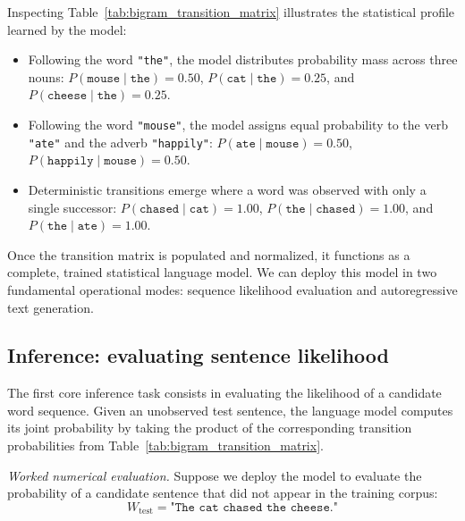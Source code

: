 \documentclass[../../../main.tex]{subfiles}
\begin{document}
Inspecting Table~\ref{tab:bigram_transition_matrix} illustrates the statistical profile learned by the model:
\begin{itemize}
    \item Following the word \texttt{"the"}, the model distributes probability mass across three nouns: $P(\texttt{mouse} \mid \texttt{the}) = 0.50$, $P(\texttt{cat} \mid \texttt{the}) = 0.25$, and $P(\texttt{cheese} \mid \texttt{the}) = 0.25$.
    \item Following the word \texttt{"mouse"}, the model assigns equal probability to the verb \texttt{"ate"} and the adverb \texttt{"happily"}: $P(\texttt{ate} \mid \texttt{mouse}) = 0.50$, $P(\texttt{happily} \mid \texttt{mouse}) = 0.50$.
    \item Deterministic transitions emerge where a word was observed with only a single successor: $P(\texttt{chased} \mid \texttt{cat}) = 1.00$, $P(\texttt{the} \mid \texttt{chased}) = 1.00$, and $P(\texttt{the} \mid \texttt{ate}) = 1.00$.
\end{itemize}

Once the transition matrix is populated and normalized, it functions as a complete, trained statistical language model. We can deploy this model in two fundamental operational modes: sequence likelihood evaluation and autoregressive text generation.

\subsection{Inference: evaluating sentence likelihood}
\label{subsec:evaluating_sentence_likelihood}

The first core inference task consists in evaluating the likelihood of a candidate word sequence. Given an unobserved test sentence, the language model computes its joint probability by taking the product of the corresponding transition probabilities from Table~\ref{tab:bigram_transition_matrix}.

\textit{Worked numerical evaluation.} Suppose we deploy the model to evaluate the probability of a candidate sentence that did not appear in the training corpus:
\begin{equation}
W_{\text{test}} = \texttt{"The cat chased the cheese."}
\end{equation}
\end{document}
